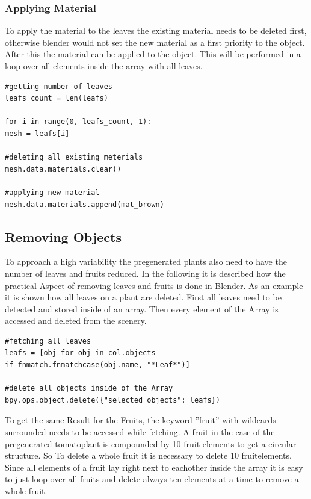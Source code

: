 \subsubsection{Applying Material}
To apply the material to the leaves the existing material needs to be deleted first, otherwise blender would not set the new material as a first priority to the object. After this the material can be applied to the object. This will be performed in a loop over all elements inside the array with all leaves.

\lstset{language=Python, frame=single}
\begin{lstlisting}
#getting number of leaves
leafs_count = len(leafs)

for i in range(0, leafs_count, 1):
mesh = leafs[i]

#deleting all existing meterials
mesh.data.materials.clear()

#applying new material
mesh.data.materials.append(mat_brown)
\end{lstlisting}

\subsection{Removing Objects}


To approach a high variability the pregenerated plants also need to have the number of leaves and fruits reduced.
In the following it is described how the practical Aspect of removing leaves and fruits is done in Blender.
As an example it is shown how all leaves on a plant are deleted. \newline
First all leaves need to be detected and stored inside of an array. Then every element of the Array is accessed and deleted from the scenery.
\lstset{language=Python, frame=single}
\begin{lstlisting}
#fetching all leaves
leafs = [obj for obj in col.objects
if fnmatch.fnmatchcase(obj.name, "*Leaf*")]

#delete all objects inside of the Array
bpy.ops.object.delete({"selected_objects": leafs})
\end{lstlisting}
To get the same Result for the Fruits, the keyword ''fruit'' with wildcards surrounded needs to be accessed while fetching. A fruit in the case of the pregenerated tomatoplant is compounded by 10 fruit-elements to get a circular structure. So To delete a whole fruit it is necessary to delete 10 fruitelements. Since all elements of a fruit lay right next to eachother inside the array it is easy to just loop over all fruits and delete always ten elements at a time to remove a whole fruit.


